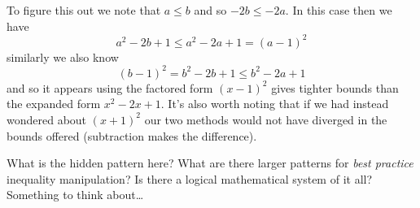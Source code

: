 \documentclass[twoside]{article}
\begin{document}
To figure this out we note that $ a\le b $ and so $ -2b\le -2a $. In this case then we have
$$ a^2-2b+1\le a^2-2a+1=(a-1)^2 $$
similarly we also know
$$ (b-1)^2=b^2-2b+1\le b^2-2a+1 $$
and so it appears using the factored form $ (x-1)^2 $ gives tighter bounds than the expanded form $ x^2-2x+1 $.
It's also worth noting that if we had instead wondered about $ (x+1)^2 $ our two methods would not have diverged in
the bounds offered (subtraction makes the difference).

What is the hidden pattern here? What are there larger patterns for \emph{best practice} inequality manipulation?
Is there a logical mathematical system of it all? Something to think about\ldots
\end{document}
